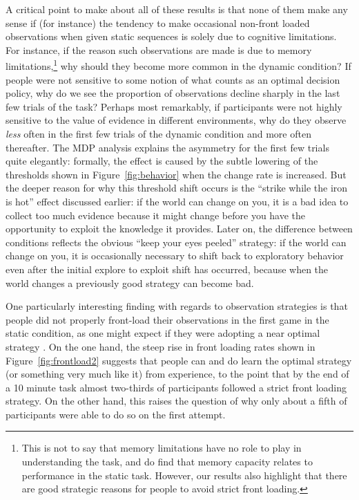 \documentclass[authoryear]{elsarticle}
\begin{document}
A critical point to make about all of these results is that none of them make any sense if (for instance) the tendency to make occasional non-front loaded observations when given static sequences is solely due to cognitive limitations. For instance, if the reason such observations are made is due to memory limitations,\footnote{This is not to say that memory limitations have no role to play in understanding the task, and \citet{rakow_role_2010} do find that memory capacity relates to performance in the static task. However, our results also highlight that there are good strategic reasons for people to avoid strict front loading.} why should they become more common in the dynamic condition? If people were not sensitive to some notion of what counts as an optimal decision policy, why do we see the proportion of observations decline sharply in the last few trials of the task?  Perhaps most remarkably, if participants were not highly sensitive to the value of evidence in different environments, why do they observe {\it less} often in the first few trials of the dynamic condition and more often thereafter. The MDP analysis explains the asymmetry for the first few trials quite elegantly: formally, the effect is caused by the subtle lowering of the thresholds shown in Figure~\ref{fig:behavior} when the change rate is increased. But the deeper reason for why this threshold shift occurs is the ``strike while the iron is hot'' effect discussed earlier: if the world can change on you, it is a bad idea to collect too much evidence because it might change before you have the opportunity to exploit the knowledge it provides. Later on, the difference between conditions reflects the obvious ``keep your eyes peeled'' strategy: if the world can change on you, it is occasionally necessary to shift back to exploratory behavior even after the initial explore to exploit shift has occurred, because when the world changes a previously good strategy can become bad.

One particularly interesting finding with regards to observation strategies is that people did not properly front-load their observations in the first game in the static condition, as one might expect if they were adopting a near optimal strategy \citep[cf.][]{rakow_role_2010,tversky_information_1966}. On the one hand, the steep rise in front loading rates shown in Figure~\ref{fig:frontload2} suggests that people can and do learn the optimal strategy (or something very much like it) from experience, to the point that by the end of a 10 minute task almost two-thirds of participants followed a strict front loading strategy. On the other hand, this raises the question of why only about a fifth of participants were able to do so on the first attempt.
\end{document}
